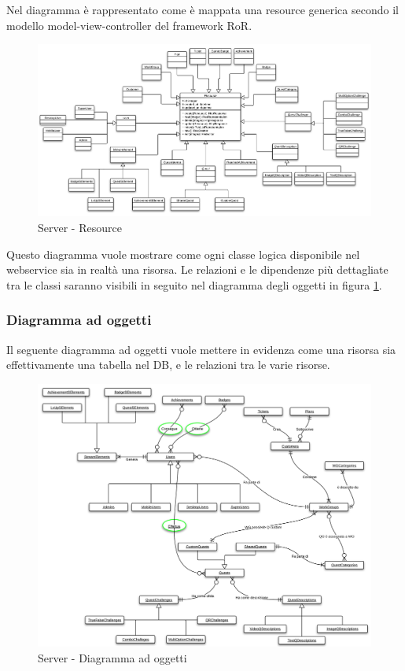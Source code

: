{{Nel diagramma è rappresentato come è mappata una resource generica secondo il modello model-view-controller del framework RoR.

\begin{figure}[H]
\centering
\includegraphics[scale=0.50]{images/cap2/Server/Resource.png}
\caption{Server - Resource}
\end{figure}

Questo diagramma vuole mostrare come ogni classe logica disponibile nel webservice sia in realtà una risorsa. Le relazioni e le dipendenze più dettagliate tra le classi saranno visibili in seguito nel diagramma degli oggetti in figura \ref{S-do}.\\


\subsubsection{Diagramma ad oggetti}
Il seguente diagramma ad oggetti vuole mettere in evidenza come una risorsa sia effettivamente una tabella nel DB, e le relazioni tra le varie risorse.

\begin{figure}[h]
\centering
\includegraphics[scale=0.55]{images/cap2/Server/Oggetti.png}
\caption{Server - Diagramma ad oggetti}
\label{S-do}  %
\end{figure}

}}
